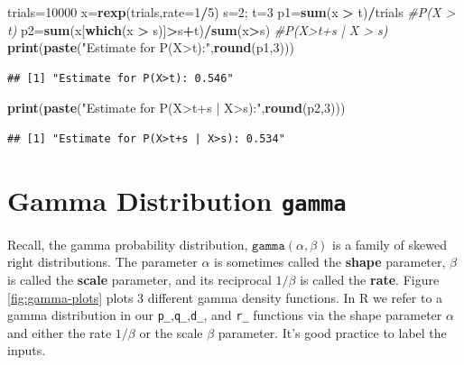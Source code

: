 \documentclass[
]{book}
\newenvironment{Shaded}{\begin{snugshade}}{\end{snugshade}}
\newcommand{\AttributeTok}[1]{\textcolor[rgb]{0.13,0.29,0.53}{#1}}
\newcommand{\CommentTok}[1]{\textcolor[rgb]{0.56,0.35,0.01}{\textit{#1}}}
\newcommand{\DecValTok}[1]{\textcolor[rgb]{0.00,0.00,0.81}{#1}}
\newcommand{\FunctionTok}[1]{\textcolor[rgb]{0.13,0.29,0.53}{\textbf{#1}}}
\newcommand{\NormalTok}[1]{#1}
\newcommand{\OtherTok}[1]{\textcolor[rgb]{0.56,0.35,0.01}{#1}}
\newcommand{\SpecialCharTok}[1]{\textcolor[rgb]{0.81,0.36,0.00}{\textbf{#1}}}
\newcommand{\StringTok}[1]{\textcolor[rgb]{0.31,0.60,0.02}{#1}}
\theoremstyle{definition}
\theoremstyle{definition}
\theoremstyle{definition}
\theoremstyle{definition}
\theoremstyle{remark}
\begin{document}
\begin{Shaded}
\begin{Highlighting}[]
\NormalTok{trials}\OtherTok{=}\DecValTok{10000}
\NormalTok{x}\OtherTok{=}\FunctionTok{rexp}\NormalTok{(trials,}\AttributeTok{rate=}\DecValTok{1}\SpecialCharTok{/}\DecValTok{5}\NormalTok{)}
\NormalTok{s}\OtherTok{=}\DecValTok{2}\NormalTok{; t}\OtherTok{=}\DecValTok{3}
\NormalTok{p1}\OtherTok{=}\FunctionTok{sum}\NormalTok{(x }\SpecialCharTok{\textgreater{}}\NormalTok{ t)}\SpecialCharTok{/}\NormalTok{trials }\CommentTok{\#P(X \textgreater{} t)}
\NormalTok{p2}\OtherTok{=}\FunctionTok{sum}\NormalTok{(x[}\FunctionTok{which}\NormalTok{(x }\SpecialCharTok{\textgreater{}}\NormalTok{ s)]}\SpecialCharTok{\textgreater{}}\NormalTok{s}\SpecialCharTok{+}\NormalTok{t)}\SpecialCharTok{/}\FunctionTok{sum}\NormalTok{(x}\SpecialCharTok{\textgreater{}}\NormalTok{s) }\CommentTok{\#P(X\textgreater{}t+s | X \textgreater{} s)}
\FunctionTok{print}\NormalTok{(}\FunctionTok{paste}\NormalTok{(}\StringTok{"Estimate for P(X\textgreater{}t):"}\NormalTok{,}\FunctionTok{round}\NormalTok{(p1,}\DecValTok{3}\NormalTok{)))}
\end{Highlighting}
\end{Shaded}

\begin{verbatim}
## [1] "Estimate for P(X>t): 0.546"
\end{verbatim}

\begin{Shaded}
\begin{Highlighting}[]
\FunctionTok{print}\NormalTok{(}\FunctionTok{paste}\NormalTok{(}\StringTok{"Estimate for P(X\textgreater{}t+s | X\textgreater{}s):"}\NormalTok{,}\FunctionTok{round}\NormalTok{(p2,}\DecValTok{3}\NormalTok{)))}
\end{Highlighting}
\end{Shaded}

\begin{verbatim}
## [1] "Estimate for P(X>t+s | X>s): 0.534"
\end{verbatim}

\section{\texorpdfstring{Gamma Distribution \texttt{gamma}}{Gamma Distribution gamma}}\label{gammaR}

Recall, the gamma probability distribution, \(\texttt{gamma}(\alpha,\beta)\) is a family of skewed right distributions. The parameter \(\alpha\) is sometimes called the \textbf{shape} parameter, \(\beta\) is called the \textbf{scale} parameter, and its reciprocal \(1/\beta\) is called the \textbf{rate}. Figure \ref{fig:gamma-plots} plots 3 different gamma density functions. In R we refer to a gamma distribution in our \texttt{p\_},\texttt{q\_},\texttt{d\_}, and \texttt{r\_} functions via the shape parameter \(\alpha\) and either the rate \(1/\beta\) or the scale \(\beta\) parameter. It's good practice to label the inputs.
\end{document}
